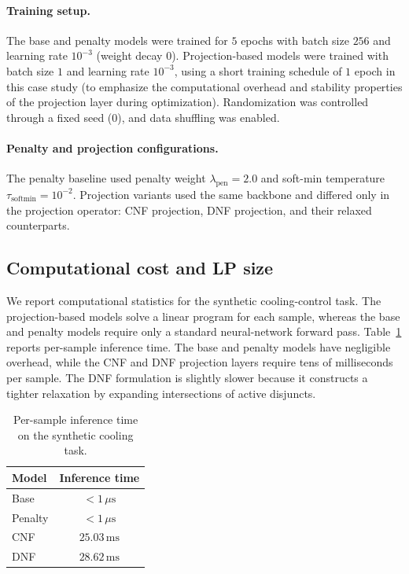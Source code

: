 \documentclass{article}
\theoremstyle{plain}
\theoremstyle{definition}
\theoremstyle{remark}
\begin{document}
\paragraph{Training setup.}
The base and penalty models were trained for $5$ epochs with batch size $256$ and learning rate $10^{-3}$ (weight decay $0$). Projection-based models were trained with batch size $1$ and learning rate $10^{-3}$, using a short training schedule of $1$ epoch in this case study (to emphasize the computational overhead and stability properties of the projection layer during optimization). Randomization was controlled through a fixed seed ($0$), and data shuffling was enabled.

\paragraph{Penalty and projection configurations.}
The penalty baseline used penalty weight $\lambda_{\text{pen}} = 2.0$ and soft-min temperature $\tau_{\text{softmin}} = 10^{-2}$. Projection variants used the same backbone and differed only in the projection operator: CNF projection, DNF projection, and their relaxed counterparts.

\subsection{Computational cost and LP size}
\label{app:compute-cost}

We report computational statistics for the synthetic cooling-control task. The projection-based models solve a linear program for each sample, whereas the base and penalty models require only a standard neural-network forward pass. Table~\ref{tab:inf-time} reports per-sample inference time. The base and penalty models have negligible overhead, while the CNF and DNF projection layers require tens of milliseconds per sample. The DNF formulation is slightly slower because it constructs a tighter relaxation by expanding intersections of active disjuncts.

\begin{table}[h]
\centering
\caption{Per-sample inference time on the synthetic cooling task.}
\label{tab:inf-time}
\begin{tabular}{lc}
\toprule
Model & Inference time \\
\midrule
Base & $<1\,\mu\mathrm{s}$ \\
Penalty & $<1\,\mu\mathrm{s}$ \\
CNF & $25.03\,\mathrm{ms}$ \\
DNF & $28.62\,\mathrm{ms}$ \\
\bottomrule
\end{tabular}
\end{table}
\end{document}
